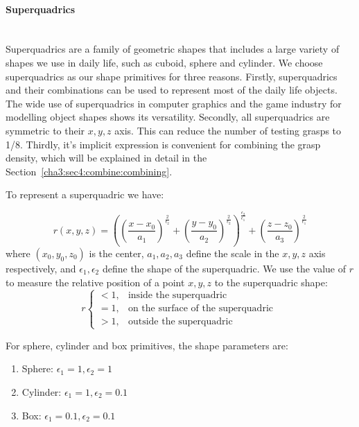\paragraph{Superquadrics} ~\\
Superquadrics are a family of geometric shapes that includes a large variety of shapes we use in daily life, such as cuboid, sphere and cylinder. We choose superquadrics as our shape primitives for three reasons. Firstly, superquadrics and their combinations can be used to represent most of the daily life objects. The wide use of superquadrics in computer graphics and the game industry for modelling object shapes shows its versatility. Secondly, all superquadrics are symmetric to their $x, y, z$ axis. This can reduce the number of testing grasps to 1/8. Thirdly, it's implicit expression is convenient for combining the grasp density, which will be explained in detail in the Section~\ref{cha3:sec4:combine:combining}.

To represent a superquadric we have:

\begin{equation}
r\left(x, y ,z\right) =
\left(\left(\frac{x-x_0}{a_1}\right)^{\frac{2}{\epsilon_2}} +
    \left(\frac{y-y_0}{a_2}\right)^{\frac{2}{\epsilon_2}}\right)^
    {\frac{\epsilon_2}{\epsilon_1}} +
    \left(\frac{z-z_0}{a_3}\right)^\frac{2}{\epsilon_1}
\end{equation}
where $\left(x_0, y_0, z_0\right)$ is the center, $a_1, a_2, a_3$ define the scale in the $x, y, z$ axis respectively, and $\epsilon_1, \epsilon_2$ define the shape of the superquadric.
We use the value of $r$ to measure the relative position of a point $x, y, z$ to the superquadric shape:
\begin{equation}
    r
    \begin{cases}
      <1, & \text{inside the superquadric}\  \\
      =1, & \text{on the surface of the superquadric}\ \\
      >1, & \text{outside the superquadric}
    \end{cases}
\end{equation}

For sphere, cylinder and box primitives, the shape parameters are:

\begin{enumerate}
\item Sphere: $\epsilon_1 = 1, \epsilon_2 = 1$
\item Cylinder: $\epsilon_1 = 1, \epsilon_2 = 0.1$
\item Box: $\epsilon_1 = 0.1, \epsilon_2 = 0.1$
\end{enumerate}

